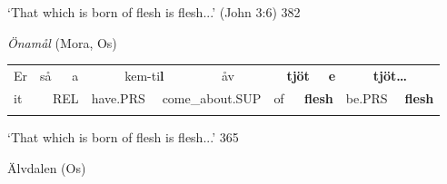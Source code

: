 \begin{styleTranslation}
‘That which is born of flesh is flesh...’ (John 3:6) 382

\end{styleTranslation}

\begin{styleExLtrTblii}
\textit{Önamål} (Mora, Os)

\end{styleExLtrTblii}

\begin{tabular}{llllllllllllllll}
\lsptoprule
Er & \multicolumn{2}{l}{så

} & \multicolumn{2}{l}{a

} & \multicolumn{2}{l}{kem-ti\textbf{l}

} & \multicolumn{2}{l}{åv

} & \multicolumn{2}{l}{{\bfseries tjöt}

} & \multicolumn{2}{l}{{\bfseries e}

} & \multicolumn{2}{l}{{\bfseries tjöt…}

} & \\
\multicolumn{2}{l}{it

} & \multicolumn{2}{l}{REL

} & \multicolumn{2}{l}{have.PRS

} & \multicolumn{2}{l}{come\_about.SUP

} & \multicolumn{2}{l}{of

} & \multicolumn{2}{l}{{\bfseries flesh}

} & \multicolumn{2}{l}{be.PRS

} & \multicolumn{2}{l}{{\bfseries flesh}

}\\
\lspbottomrule
\end{tabular}

\begin{styleTranslation}
‘That which is born of flesh is flesh...’\textbf{ }365\textbf{ }

\end{styleTranslation}


\begin{listWWNumileveli}
\item {}

\end{listWWNumileveli}

\begin{listWWNumxxviiileveli}
\item {}

\begin{styleExLtrTbl}
Älvdalen (Os)

\end{styleExLtrTbl}

\end{listWWNumxxviiileveli}

